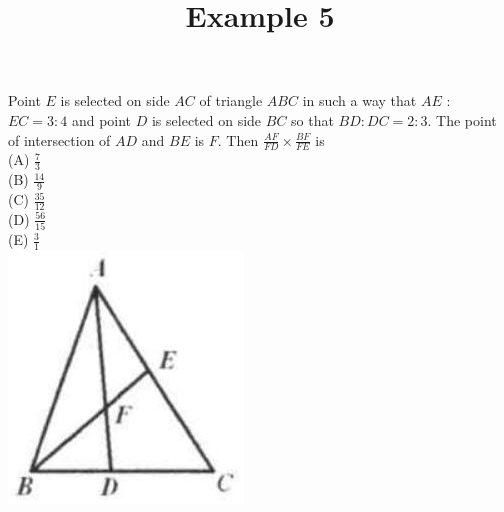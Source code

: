 \documentclass{article}
\title{Example 5}
\date{}
\begin{document}
\maketitle

Point \(E\) is selected on side \(A C\) of triangle \(A B C\) in such a way that \(A E\) : \(E C=3: 4\) and point \(D\) is selected on side \(B C\) so that \(B D: D C=2: 3\). The point of intersection of \(A D\) and \(B E\) is \(F\). Then \(\frac{A F}{F D} \times \frac{B F}{F E}\) is\\
(A) \(\frac{7}{3}\)\\
(B) \(\frac{14}{9}\)\\
(C) \(\frac{35}{12}\)\\
(D) \(\frac{56}{15}\)\\
(E) \(\frac{3}{1}\)\\
\centering
\includegraphics[width=\textwidth]{images/problem_image_1.jpg}
\end{document}
